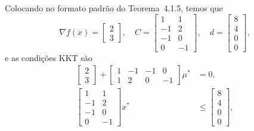 \begin{questions}
    

\setcounter{question}{4}
\begin{solution}
    Colocando no formato padrão do Teorema~4.1.5, temos que
    \[
    \nabla f(x) = \begin{bmatrix} 2\\ 3\end{bmatrix},\quad 
    C = \begin{bmatrix} 1 & 1\\ -1 & 2\\ -1 & 0\\ 0 & -1\end{bmatrix},\quad 
    d = \begin{bmatrix} 8\\ 4\\ 0\\ 0\end{bmatrix},
    \]
    e as condições KKT são
    \begin{align*}
        \begin{bmatrix}
            2\\ 3
        \end{bmatrix}
        + \begin{bmatrix} 1 & -1 & -1 & 0\\ 1 & 2 & 0 & -1\end{bmatrix}\mu^* &= 0,\\
        \begin{bmatrix} 1 & 1\\ -1 & 2\\ -1 & 0\\ 0 & -1\end{bmatrix}x^* &\le \begin{bmatrix} 8\\ 4\\ 0\\ 0\end{bmatrix},\\

\end{align*}
\end{solution}
\end{questions}
